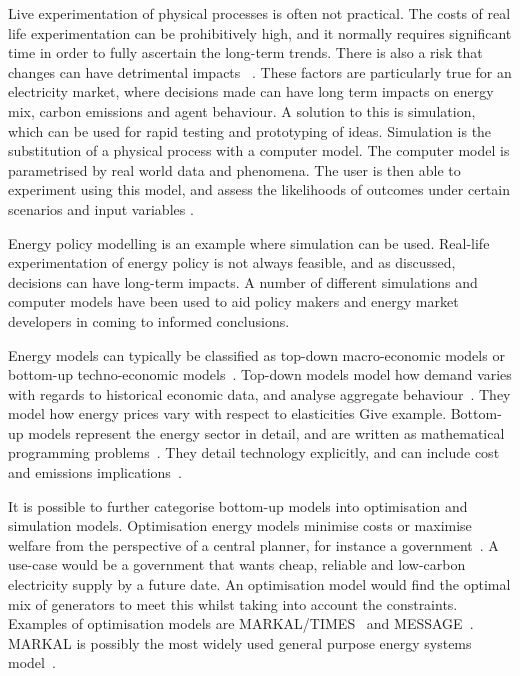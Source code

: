 Live experimentation of physical processes is often not practical. The costs of real life experimentation can be prohibitively high, and it normally requires significant time in order to fully ascertain the long-term trends. There is also a risk that changes can have detrimental impacts ~\cite{Forshaw2016}. These factors are particularly true for an electricity market, where decisions made can have long term impacts on energy mix, carbon emissions and agent behaviour.  A solution to this is simulation, which can be used for rapid testing and prototyping of ideas. Simulation is the substitution of a physical process with a computer model. The computer model is parametrised by real world data and phenomena. The user is then able to experiment using this model, and assess the likelihoods of outcomes under certain scenarios and input variables \cite{Law:603360}.

Energy policy modelling is an example where simulation can be used. Real-life experimentation of energy policy is not always feasible, and as discussed, decisions can have long-term impacts. A number of different simulations and computer models have been used to aid policy makers and energy market developers in coming to informed conclusions.

Energy models can typically be classified as top-down macro-economic models or bottom-up techno-economic models~\cite{Bohringer1998}. Top-down models model how demand varies with regards to historical economic data, and analyse aggregate behaviour~\cite{Hall2016}. They model how energy prices vary with respect to elasticities {\color{red}Give example}. Bottom-up models represent the energy sector in detail, and are written as mathematical programming problems~\cite{Gargiulo2013}. They detail technology explicitly, and can include cost and emissions implications~\cite{Hall2016}.

It is possible to further categorise bottom-up models into optimisation and simulation models. Optimisation energy models minimise costs or maximise welfare from the perspective of a central planner, for instance a government~\cite{Keles2017}. A use-case would be a government that wants cheap, reliable and low-carbon electricity supply by a future date. An optimisation model would find the optimal mix of generators to meet this whilst taking into account the constraints. Examples of optimisation models are MARKAL/TIMES~\cite{Fishbone1981} and MESSAGE~\cite{Schrattenholzer1981}. MARKAL is possibly the most widely used general purpose energy systems model~\cite{Pfenninger2014}.

